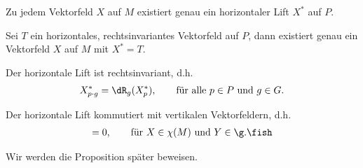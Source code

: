 \documentclass[%
	paper=a5,%
	fleqn,%
	DIV=18,%
	BCOR=0mm,
	fontsize=11pt,
	titlepage=false,%
	bibliography=totoc,
	DIV=18,%
	twoside=true,
	pdftitle=Riemannsche Geometrie,
	pdfauthor=Uwe Semmelmann,
	numbers=noendperiod]%
	{scrbook}
\begin{document}
\begin{prop}[Proposition]
\begin{propenum}
\item Zu jedem Vektorfeld $X$ auf $M$ existiert genau ein horizontaler Lift
$X^*$ auf $P$.
\item Sei $T$ ein horizontales, rechtsinvariantes Vektorfeld auf $P$, dann
existiert genau ein Vektorfeld $X$ auf $M$ mit $X^* = T$. 
\item Der horizontale Lift ist rechtsinvariant, d.h.
\begin{align*}
X^*_{p\cdot g} = \dR_g(X_p^*),\qquad \text{für alle }p\in P\text{ und }g\in G.
\end{align*}
\item Der horizontale Lift kommutiert mit vertikalen Vektorfeldern, d.h.
\begin{align*}
[\tilde{Y},X^*] = 0,\qquad \text{für }X\in\chi(M)\text{ und }Y\in\g.\fish
\end{align*}
\end{propenum}
\end{prop}

Wir werden die Proposition später beweisen.
\end{document}
